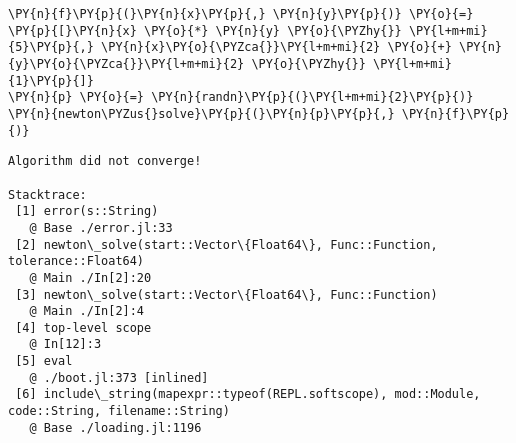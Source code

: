     \begin{tcolorbox}[breakable, size=fbox, boxrule=1pt, pad at break*=1mm,colback=cellbackground, colframe=cellborder]
\begin{Verbatim}[commandchars=\\\{\}]
\PY{n}{f}\PY{p}{(}\PY{n}{x}\PY{p}{,} \PY{n}{y}\PY{p}{)} \PY{o}{=} \PY{p}{[}\PY{n}{x} \PY{o}{*} \PY{n}{y} \PY{o}{\PYZhy{}} \PY{l+m+mi}{5}\PY{p}{,} \PY{n}{x}\PY{o}{\PYZca{}}\PY{l+m+mi}{2} \PY{o}{+} \PY{n}{y}\PY{o}{\PYZca{}}\PY{l+m+mi}{2} \PY{o}{\PYZhy{}} \PY{l+m+mi}{1}\PY{p}{]}
\PY{n}{p} \PY{o}{=} \PY{n}{randn}\PY{p}{(}\PY{l+m+mi}{2}\PY{p}{)}
\PY{n}{newton\PYZus{}solve}\PY{p}{(}\PY{n}{p}\PY{p}{,} \PY{n}{f}\PY{p}{)}
\end{Verbatim}
\end{tcolorbox}

    \begin{Verbatim}[commandchars=\\\{\}, frame=single, framerule=2mm, rulecolor=\color{outerrorbackground}]
Algorithm did not converge!

Stacktrace:
 [1] error(s::String)
   @ Base ./error.jl:33
 [2] newton\_solve(start::Vector\{Float64\}, Func::Function, tolerance::Float64)
   @ Main ./In[2]:20
 [3] newton\_solve(start::Vector\{Float64\}, Func::Function)
   @ Main ./In[2]:4
 [4] top-level scope
   @ In[12]:3
 [5] eval
   @ ./boot.jl:373 [inlined]
 [6] include\_string(mapexpr::typeof(REPL.softscope), mod::Module, code::String, filename::String)
   @ Base ./loading.jl:1196
    \end{Verbatim}